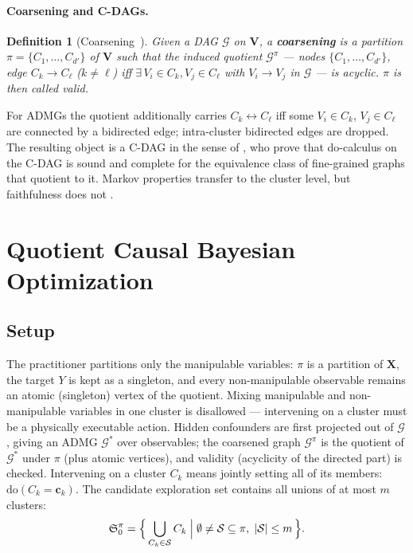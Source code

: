 \documentclass{article}
\newtheorem{definition}{Definition}
\renewcommand{\do}{\mathrm{do}}
\newcommand{\Gq}{\mathcal{G}^{\pi}}
\newcommand{\Gg}{\mathcal{G}}
\newcommand{\ESpi}{\mathfrak{S}^{\pi}}
\begin{document}
\paragraph{Coarsening and C-DAGs.}
\begin{definition}[Coarsening~\citep{madaleno2026coarsening}]
\label{def:coarsening}
Given a DAG $\Gg$ on $\mathbf{V}$, a \textbf{coarsening} is a partition
$\pi=\{C_1,\ldots,C_{d'}\}$ of $\mathbf{V}$ such that the induced quotient
$\Gq$ --- nodes $\{C_1,\ldots,C_{d'}\}$, edge $C_k\to C_\ell$ ($k \neq
\ell$) iff $\exists\, V_i\in C_k, V_j\in C_\ell$ with $V_i\to V_j$ in
$\Gg$ --- is acyclic. $\pi$ is then called \emph{valid}.
\end{definition}
For ADMGs the quotient additionally carries $C_k \leftrightarrow C_\ell$
iff some $V_i \in C_k$, $V_j \in C_\ell$ are connected by a bidirected
edge; intra-cluster bidirected edges are dropped. The resulting object is a
C-DAG in the sense of \citet{anand2023cdag}, who prove that do-calculus on
the C-DAG is sound and complete for the equivalence class of fine-grained
graphs that quotient to it. Markov properties transfer to the cluster
level, but faithfulness does not \citep{wahl2024foundations}.


\section{Quotient Causal Bayesian Optimization}
\label{sec:ccbo}

\subsection{Setup}
\label{sec:setup}

The practitioner partitions only the manipulable variables: $\pi$ is a
partition of $\mathbf{X}$, the target $Y$ is kept as a singleton, and every
non-manipulable observable remains an atomic (singleton) vertex of the
quotient. Mixing manipulable and non-manipulable variables in one cluster
is disallowed --- intervening on a cluster must be a physically executable
action. Hidden confounders are first projected out of $\Gg$
\citep{lee2019latent}, giving an ADMG $\Gg^{*}$ over observables; the
coarsened graph $\Gq$ is the quotient of $\Gg^{*}$ under $\pi$ (plus
atomic vertices), and validity (acyclicity of the directed part) is
checked. Intervening on a cluster $C_k$ means jointly setting all of its
members: $\do(C_k = \mathbf{c}_k)$. The candidate exploration set contains
all unions of at most $m$ clusters:
\begin{equation}
  \label{eq:ccbo_exploration}
  \ESpi_{0} = \Bigl\{\, \bigcup_{C_k \in \mathcal{S}} C_k
  \;\Big|\; \emptyset \neq \mathcal{S} \subseteq \pi,\;
  |\mathcal{S}| \leq m \,\Bigr\}.
\end{equation}
\end{document}
